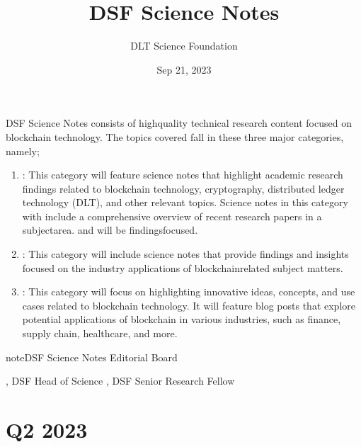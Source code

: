 \documentclass[letterpaper,10pt,english]{jupyterBook}
\title{DSF Science Notes}
\date{Sep 21, 2023}
\author{DLT Science Foundation}
\begin{document}
\pagestyle{empty}
\sphinxmaketitle
\pagestyle{plain}
\sphinxtableofcontents
\pagestyle{normal}
\label{\detokenize{intro::doc}}


\sphinxAtStartPar
DSF Science Notes consists of high\sphinxhyphen{}quality technical research content focused on blockchain technology. The topics covered fall in these three major categories, namely;
\begin{enumerate}
%
\item {} 
\sphinxAtStartPar
{}: This category will feature science notes that highlight academic research findings related to blockchain technology, cryptography, distributed ledger technology (DLT), and other relevant topics. Science notes in this category with include a comprehensive overview of recent research papers in a subject\sphinxhyphen{}area. and will be findings\sphinxhyphen{}focused.

\item {} 
\sphinxAtStartPar
{}: This category will include science notes that provide findings and insights focused on the industry applications of blockchain\sphinxhyphen{}related subject matters.

\item {} 
\sphinxAtStartPar
{}: This category will focus on highlighting innovative ideas, concepts, and use cases related to blockchain technology. It will feature blog posts that explore potential applications of blockchain in various industries, such as finance, supply chain, healthcare, and more.

\end{enumerate}

\sphinxAtStartPar
{}

\begin{sphinxadmonition}{note}{DSF Science Notes Editorial Board}

\sphinxAtStartPar
{}, DSF Head of Science
, DSF Senior Research Fellow
\end{sphinxadmonition}

\sphinxstepscope


\part{Q2 2023}
\end{document}
